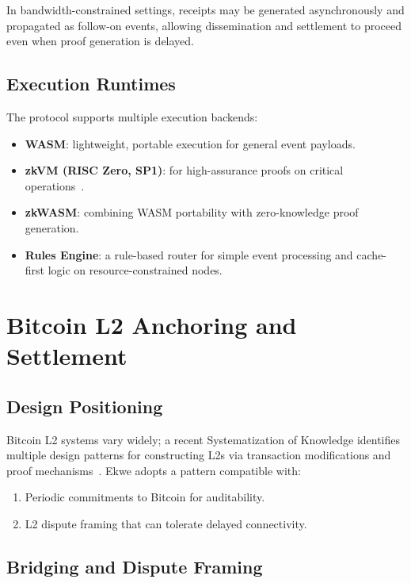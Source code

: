 \documentclass[11pt,a4paper]{article}
\begin{document}
In bandwidth-constrained settings, receipts may be generated asynchronously and propagated as follow-on events, allowing dissemination and settlement to proceed even when proof generation is delayed.

\subsection{Execution Runtimes}

The protocol supports multiple execution backends:
\begin{itemize}[nosep]
  \item \textbf{WASM}: lightweight, portable execution for general event payloads.
  \item \textbf{zkVM (RISC Zero, SP1)}: for high-assurance proofs on critical operations~\cite{risczero}.
  \item \textbf{zkWASM}: combining WASM portability with zero-knowledge proof generation.
  \item \textbf{Rules Engine}: a rule-based router for simple event processing and cache-first logic on resource-constrained nodes.
\end{itemize}

\section{Bitcoin L2 Anchoring and Settlement}

\subsection{Design Positioning}

Bitcoin L2 systems vary widely; a recent Systematization of Knowledge identifies multiple design patterns for constructing L2s via transaction modifications and proof mechanisms~\cite{sok_btc_l2}. Ekwe adopts a pattern compatible with:
\begin{enumerate}[nosep]
  \item Periodic commitments to Bitcoin for auditability.
  \item L2 dispute framing that can tolerate delayed connectivity.
\end{enumerate}

\subsection{Bridging and Dispute Framing}
\end{document}
